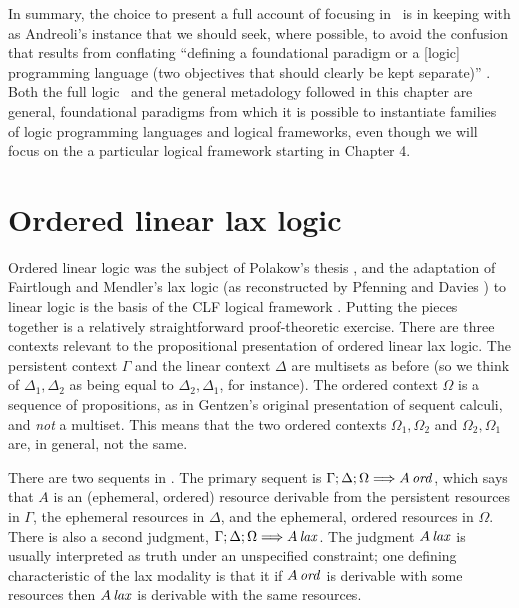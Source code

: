 In summary, the choice to present a full account of focusing in
\ollll~is in keeping with as Andreoli's instance that we should seek,
where possible, to avoid the confusion that results from conflating
``defining a foundational paradigm or a [logic] programming language
(two objectives that should clearly be kept separate)''
\cite{andreoli01focussing}. Both the full logic \ollll~and the general
metadology followed in this chapter are general, foundational
paradigms from which it is possible to instantiate families of logic
programming languages and logical frameworks, even though we will
focus on the a particular logical framework starting in Chapter 4.

\section{Ordered linear lax logic}
\label{sec:ord-unfocused}

Ordered linear logic was the subject of Polakow's thesis
\cite{polakow01ordered}, and the adaptation of Fairtlough and
Mendler's lax logic \cite{fairtlough95propositional} (as reconstructed
by Pfenning and Davies \cite{pfenning01judgmental}) to linear logic is
the basis of the CLF logical framework
\cite{watkins02concurrent}. Putting the pieces together is a
relatively straightforward proof-theoretic exercise. There are three
contexts relevant to the propositional presentation of ordered linear
lax logic.  The persistent context $\Gamma$ and the linear context
$\Delta$ are multisets as before (so we think of $\Delta_1, \Delta_2$
as being equal to $\Delta_2, \Delta_1$, for instance). The ordered
context $\Omega$ is a sequence of propositions, as in Gentzen's
original presentation of sequent calculi, and {\it not} a multiset.
This means that the two ordered contexts $\Omega_1, \Omega_2$ and
$\Omega_2, \Omega_1$ are, in general, not the same.



There are two sequents in \ollll.  The primary sequent is
${\Gamma};{\Delta};{\Omega} \Longrightarrow {{A}\,{{\it ord}}} \mathstrut$, which says that $A$ is an
(ephemeral, ordered) resource derivable from the persistent resources
in $\Gamma$, the ephemeral resources in $\Delta$, and the ephemeral,
ordered resources in $\Omega$. There is also a second judgment,
${\Gamma};{\Delta};{\Omega} \Longrightarrow {{A}\,{{\it lax}}} \mathstrut$. The judgment ${A}\,{{\it lax}}$
is usually interpreted as truth under an unspecified constraint; one
defining characteristic of the lax modality is that it if ${A}\,{{\it ord}}$
is derivable with some resources then ${A}\,{{\it lax}}$ is derivable with
the same resources.

